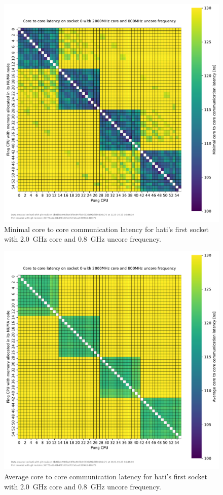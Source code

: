 \begin{figure}[]
    \centering
    \includegraphics[width=\columnwidth]{fig/core-to-core-latency/core-to-core-heatmap-min-2000-800.pdf}
    \caption{Minimal core to core communication latency for hati's first socket with \SI{2.0}{\GHz} core and \SI{0.8}{\GHz} uncore frequency.}
\end{figure}
\begin{figure}[]
    \centering
    \includegraphics[width=\columnwidth]{fig/core-to-core-latency/core-to-core-heatmap-avg-2000-800.pdf}
    \caption{Average core to core communication latency for hati's first socket with \SI{2.0}{\GHz} core and \SI{0.8}{\GHz} uncore frequency.}
\end{figure}
